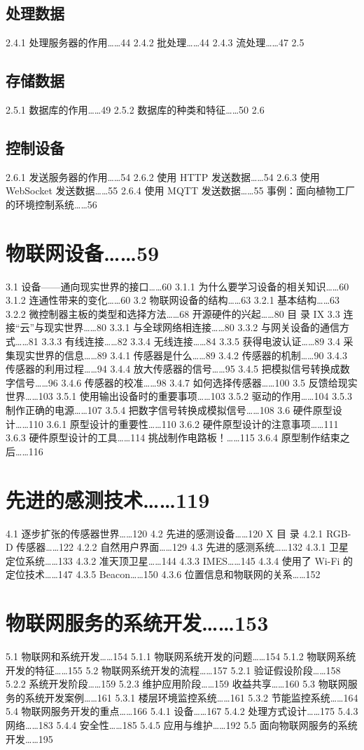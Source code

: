 \documentclass[12pt,UTF8]{ctexbook}
\begin{document}
\section{处理数据}
2.4.1
处理服务器的作用……44
2.4.2
批处理……44
2.4.3
流处理……47
2.5
\section{存储数据}
2.5.1
数据库的作用……49
2.5.2
数据库的种类和特征……50
2.6
\section{控制设备}
2.6.1
发送服务器的作用……54
2.6.2
使用 HTTP 发送数据……54
2.6.3
使用 WebSocket 发送数据……55
2.6.4
使用 MQTT 发送数据……55
事例：面向植物工厂的环境控制系统……56

\chapter{物联网设备……59}
3.1
设备——通向现实世界的接口……60
3.1.1
为什么要学习设备的相关知识……60
3.1.2
连通性带来的变化……60
3.2
物联网设备的结构……63
3.2.1
基本结构……63
3.2.2
微控制器主板的类型和选择方法……68
开源硬件的兴起……80
目
录
IX
3.3
连接“云”与现实世界……80
3.3.1
与全球网络相连接……80
3.3.2
与网关设备的通信方式……81
3.3.3
有线连接……82
3.3.4
无线连接……84
3.3.5
获得电波认证……89
3.4
采集现实世界的信息……89
3.4.1
传感器是什么……89
3.4.2
传感器的机制……90
3.4.3
传感器的利用过程……94
3.4.4
放大传感器的信号……95
3.4.5
把模拟信号转换成数字信号……96
3.4.6
传感器的校准……98
3.4.7
如何选择传感器……100
3.5
反馈给现实世界……103
3.5.1
使用输出设备时的重要事项……103
3.5.2
驱动的作用……104
3.5.3
制作正确的电源……107
3.5.4
把数字信号转换成模拟信号……108
3.6
硬件原型设计……110
3.6.1
原型设计的重要性……110
3.6.2
硬件原型设计的注意事项……111
3.6.3
硬件原型设计的工具……114
挑战制作电路板！……115
3.6.4
原型制作结束之后……116

\chapter{先进的感测技术……119}
4.1
逐步扩张的传感器世界……120
4.2
先进的感测设备……120
X
目
录
4.2.1
RGB-D 传感器……122
4.2.2
自然用户界面……129
4.3
先进的感测系统……132
4.3.1
卫星定位系统……133
4.3.2
准天顶卫星……144
4.3.3
IMES……145
4.3.4
使用了 Wi-Fi 的定位技术……147
4.3.5
Beacon……150
4.3.6
位置信息和物联网的关系……152

\chapter{物联网服务的系统开发……153}
5.1
物联网和系统开发……154
5.1.1
物联网系统开发的问题……154
5.1.2
物联网系统开发的特征……155
5.2
物联网系统开发的流程……157
5.2.1
验证假设阶段……158
5.2.2
系统开发阶段……159
5.2.3
维护应用阶段……159
收益共享……160
5.3
物联网服务的系统开发案例……161
5.3.1
楼层环境监控系统……161
5.3.2
节能监控系统……164
5.4
物联网服务开发的重点……166
5.4.1
设备……167
5.4.2
处理方式设计……175
5.4.3
网络……183
5.4.4
安全性……185
5.4.5
应用与维护……192
5.5
面向物联网服务的系统开发……195
\end{document}
